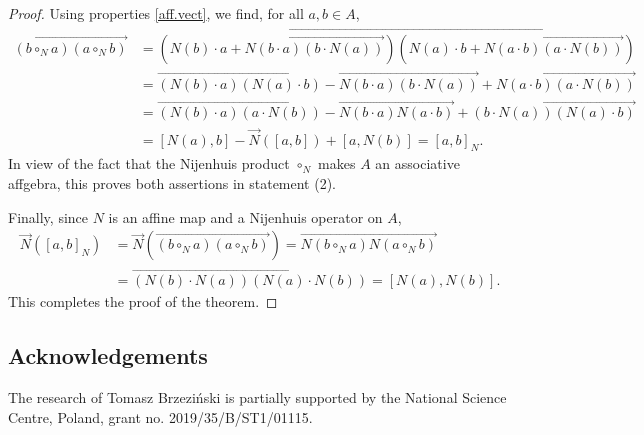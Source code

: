 \documentclass[10pt,a4paper]{amsart}
\numberwithin{equation}{section}
\begin{document}
\begin{proof}
Using properties \eqref{aff.vect}, we find, for all $a,b\in A$,
\begin{align*}
 \overrightarrow{(b\circ_N a)(a\circ_N b)}
 &= \overrightarrow{\left(N(b)\cdot a + \overrightarrow{N(b\cdot a)(b\cdot N(a))}\right)\left(N(a)\cdot b + \overrightarrow{N(a\cdot b)(a\cdot N(b))}\right)}\\
 &= \overrightarrow{(N(b)\cdot a)(N(a)\cdot b)}-\overrightarrow{N(b\cdot a)(b\cdot N(a))}+ \overrightarrow{N(a\cdot b)(a\cdot N(b))}\\
 &= \overrightarrow{(N(b)\cdot a)(a\cdot N(b))}-\overrightarrow{N(b\cdot a)N(a\cdot b)}+ \overrightarrow{(b\cdot N(a))(N(a)\cdot b)}\\
 &=[N(a),b] -\vec{N}([a,b]) + [a, N(b)] =[a,b]_N.
\end{align*}
In view of the fact that the Nijenhuis product $\circ_N$ makes $A$ an associative affgebra, this proves both assertions in statement (2).

Finally, since $N$ is an affine map and a Nijenhuis operator on $A$,
\begin{align*}
\vec{N}([a,b]_N) &=\vec{N}\left( \overrightarrow{(b\circ_N a)(a\circ_N b)}\right) =\overrightarrow{N(b\circ_N a)N(a\circ_N b)}\\
 &= \overrightarrow{\left(N(b)\cdot N(a)\right)\left(N(a)\cdot N (b)\right)} = [N(a),N(b)].
\end{align*}
This completes the proof of the theorem.
\end{proof}

\subsection*{Acknowledgements}
The research of Tomasz Brzezi\'nski is partially supported by the National Science Centre, Poland, grant no. 2019/35/B/ST1/01115.

\end{document}
